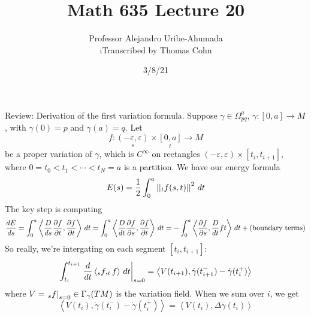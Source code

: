 \documentclass[10pt,letterpaper]{article}
\author{Professor Alejandro Uribe-Ahumada\\ \small\i{Transcribed by Thomas Cohn}}
\title{Math 635 Lecture 20}
\date{3/8/21} %
\newcommand{\n}{\hfill\break}
\newcommand{\ptxt}[1]{\textrm{\textnormal{#1}}}
\let\d\relax
\newcommand{\d}{\partial}
\newcommand{\abs}[1]{\left|#1\right|}
\newcommand{\restr}[1]{\left.#1\right|}
\newcommand{\norm}[1]{\abs{\abs{#1}}}
\newcommand{\iprod}[1]{\left<#1\right>}
\newcommand{\pd}[2]{\frac{\partial{}#1}{\partial{}#2}}
\begin{document}
\maketitle
\setlength\RaggedRightParindent{\parindent}
\RaggedRight


\par\noindent
Review: Derivation of the first variation formula. Suppose $\gamma\in\Omega_{pq}^{a}$, $\gamma:[0,a]\to{}M$, with $\gamma(0)=p$ and $\gamma(a)=q$. Let
\[
	f:\underset{s}{(-\varepsilon,\varepsilon)}\times\underset{t}{[0,a]}\to{}M
\]
be a proper variation of $\gamma$, which is $C^{\infty}$ on rectangles $(-\varepsilon,\varepsilon)\times[t_{i},t_{i+1}]$, where $0=t_{0}<t_{1}<\cdots<t_{N}=a$ is a partition. We have our energy formula
\[
	E(s)=\frac{1}{2}\int_{0}^{a}\norm{\d_{t}f(s,t)}^{2}\,dt
\]
The key step is computing
\[
	\frac{dE}{ds}=\int_{0}^{a}\iprod{\frac{D}{ds}\pd{f}{t},\pd{f}{t}}\,dt=\int_{0}^{a}\iprod{\frac{D}{dt}\pd{f}{s},\pd{f}{t}}\,dt=-\int_{0}^{a}\iprod{\pd{f}{s},\frac{D}{dt}\d{f}{t}}\,dt+\ptxt{(boundary terms)}
\]
So really, we're intergating on each segment $[t_{i},t_{i+1}]$:
\[
	\int_{t_{i}}^{t_{i+1}}\restr{\frac{d}{dt}\iprod{\d_{s}f,\d_{t}f}\,dt}_{s=0}=\iprod{V(t_{i+1}),\dot\gamma(t_{i+1}^{-})-\dot\gamma(t_{i}^{+})}
\]
where $V=\restr{\d_{s}f}_{s=0}\in\Gamma_{\gamma}(TM)$ is the variation field. When we sum over $i$, we get
\[
	\iprod{V(t_{i}),\dot\gamma(t_{i}^{-})-\dot\gamma(t_{i}^{+})}=\iprod{V(t_{i}),\Delta\dot\gamma(t_{i})}
\]
\end{document}
